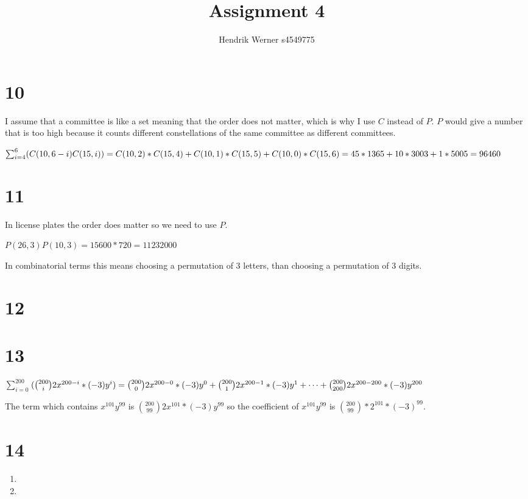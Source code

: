 \documentclass[12pt]{article}
\title {Assignment 4}
\author {Hendrik Werner s4549775}
\begin{document}
\maketitle

\section*{10}
I assume that a committee is like a set meaning that the order does not matter, which is why I use $C$ instead of $P$. $P$ would give a number that is too high because it counts different constellations of the same committee as different committees.

$\sum_{i = 4}^{6}(C(10, 6 - i)C(15, i))\\
= C(10, 2) * C(15, 4) + C(10, 1) * C(15, 5) + C(10, 0) * C(15, 6)\\
= 45 * 1365 + 10 * 3003 + 1 * 5005 = 96460$

\section*{11}
In license plates the order does matter so we need to use $P$.

$P(26, 3)P(10, 3) = 15 600 * 720 = 11 232 000$

In combinatorial terms this means choosing a permutation of 3 letters, than choosing a permutation of 3 digits.

\section*{12}
\section*{13}
$\sum_{i = 0}^{200}$$(\binom{200}{i} 2x^{200 - i} * (-3)y^i)\\
= \binom{200}{0} 2x^{200 - 0} * (-3)y^0 + \binom{200}{1} 2x^{200 - 1} * (-3)y^1 + \dots + \binom{200}{200} 2x^{200 - 200} * (-3)y^{200}$

The term which contains $x^{101}y^{99}$ is $\binom{200}{99} 2x^{101} * (-3)y^{99}$ so the coefficient of $x^{101}y^{99}$ is $\binom{200}{99} * 2^{101} * (-3)^{99}$.

\section*{14}
\begin{enumerate}[a]
	\item
	\item
\end{enumerate}
\end{document}
